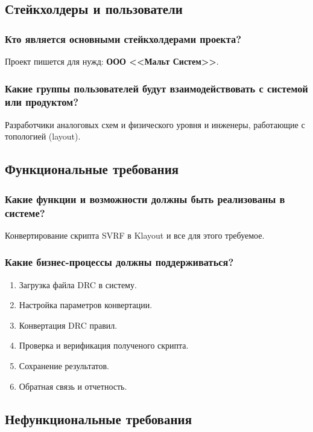 \subsection{Стейкхолдеры и пользователи}

\subsubsection{Кто является основными стейкхолдерами проекта?}
Проект пишется для нужд: \textbf{ООО <<Мальт Систем>>}.

\subsubsection{Какие группы пользователей будут взаимодействовать
	с системой или продуктом?}
Разработчики аналоговых схем и физического уровня
и инженеры, работающие с топологией (layout).

\subsection{Функциональные требования}

\subsubsection{Какие функции и возможности должны быть реализованы в системе?}
Конвертирование скрипта SVRF в Klayout и все для этого требуемое.

\subsubsection{Какие бизнес-процессы должны поддерживаться?}

\begin{enumerate}
	\item Загрузка файла DRC в систему.
	\item Настройка параметров конвертации.
	\item Конвертация DRC правил.
	\item Проверка и верификация полученого скрипта.
	\item Сохранение результатов.
	\item Обратная связь и отчетность.
\end{enumerate}

\subsection{Нефункциональные требования}

